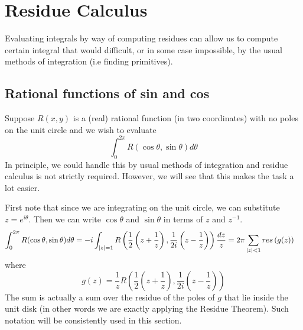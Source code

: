 \section{Residue Calculus}
Evaluating integrals by way of computing residues can allow us to compute certain integral that would difficult, or in some case impossible, by the usual methods of integration (i.e finding primitives).
\subsection{Rational functions of sin and cos}
Suppose $R(x, y)$ is a (real) rational function (in two coordinates) with no poles on the unit circle and we wish to evaluate
$$ \int_0^{2\pi} R(\cos \theta, \sin \theta) d\theta $$
In principle, we could handle this by usual methods of integration and residue calculus is not strictly required. However, we will see that this makes the task a lot easier.

First note that since we are integrating on the unit circle, we can substitute $z = e^{i \theta}$. Then we can write $\cos \theta$ and $\sin \theta$ in terms of $z$ and $z^{-1}$.
\begin{align*}
    \int_0^{2\pi} R(\cos \theta, \sin \theta) d\theta &= -i \int_{\left|z\right| = 1} R \left( \frac{1}{2} \left(z + \frac{1}{z}\right), \frac{1}{2i} \left(z - \frac{1}{z}\right)    \right) \frac{dz}{z} = 2\pi \sum_{\left|z\right| < 1} res \left( g(z) \right)
\end{align*}
where 
$$ g(z) = \frac{1}{z}R \left( \frac{1}{2} \left(z + \frac{1}{z}\right), \frac{1}{2i} \left(z - \frac{1}{z}\right) \right) $$
The sum is actually a sum over the residue of the poles of $g$ that lie inside the unit disk (in other words we are exactly applying the Residue Theorem). Such notation will be consistently used in this section.

